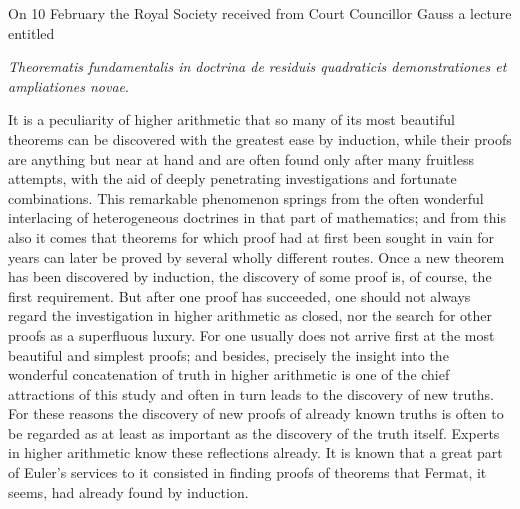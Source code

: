\documentclass[12pt]{article}
\begin{document}
On 10 February the Royal Society received from Court Councillor Gauss a lecture entitled
\begin{center}\textit{Theorematis fundamentalis in doctrina de residuis quadraticis demonstrationes et ampliationes novae}.\end{center}
It is a peculiarity of higher arithmetic that so many of its most beautiful theorems can be discovered with the greatest ease by induction, while their proofs are anything but near at hand and are often found only after many fruitless attempts, with the aid of deeply penetrating investigations and fortunate combinations. This remarkable phenomenon springs from the often wonderful interlacing of heterogeneous doctrines in that part of mathematics; and from this also it comes that theorems for which proof had at first been sought in vain for years can later be proved by several wholly different routes. Once a new theorem has been discovered by induction, the discovery of some proof is, of course, the first requirement. But after one proof has succeeded, one should not always regard the investigation in higher arithmetic as closed, nor the search for other proofs as a superfluous luxury. For one usually does not arrive first at the most beautiful and simplest proofs; and besides, precisely the insight into the wonderful concatenation of truth in higher arithmetic is one of the chief attractions of this study and often in turn leads to the discovery of new truths. For these reasons the discovery of new proofs of already known truths is often to be regarded as at least as important as the discovery of the truth itself. Experts in higher arithmetic know these reflections already. It is known that a great part of Euler's services to it consisted in finding proofs of theorems that Fermat, it seems, had already found by induction.
\end{document}
